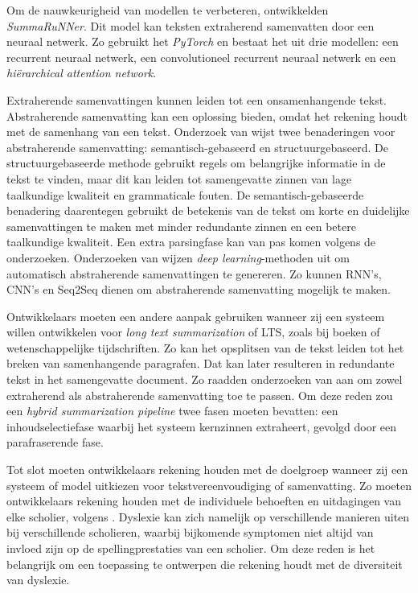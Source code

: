 Om de nauwkeurigheid van modellen te verbeteren, ontwikkelden \textcite{Nallapati2017} \textit{SummaRuNNer}. Dit model kan teksten extraherend samenvatten door een neuraal netwerk. Zo gebruikt het \textit{PyTorch} en bestaat het uit drie modellen: een recurrent neuraal netwerk, een convolutioneel recurrent neuraal netwerk en een \textit{hiërarchical attention network}.

\medspace

Extraherende samenvattingen kunnen leiden tot een onsamenhangende tekst. Abstraherende samenvatting kan een oplossing bieden, omdat het rekening houdt met de samenhang van een tekst. Onderzoek van \textcite{Gupta2019} wijst twee benaderingen voor abstraherende samenvatting: semantisch-gebaseerd en structuurgebaseerd. De structuurgebaseerde methode gebruikt regels om belangrijke informatie in de tekst te vinden, maar dit kan leiden tot samengevatte zinnen van lage taalkundige kwaliteit en grammaticale fouten. De semantisch-gebaseerde benadering daarentegen gebruikt de betekenis van de tekst om korte en duidelijke samenvattingen te maken met minder redundante zinnen en een betere taalkundige kwaliteit. Een extra parsingfase kan van pas komen volgens de onderzoeken. Onderzoeken van \textcite{Suleiman2020, Cao2022} wijzen \textit{deep learning}-methoden uit om automatisch abstraherende samenvattingen te genereren. Zo kunnen RNN's, CNN's en Seq2Seq dienen om abstraherende samenvatting mogelijk te maken. 

\medspace

Ontwikkelaars moeten een andere aanpak gebruiken wanneer zij een systeem willen ontwikkelen voor \textit{long text summarization} of LTS, zoals bij boeken of wetenschappelijke tijdschriften. Zo kan het opsplitsen van de tekst leiden tot het breken van samenhangende paragrafen. Dat kan later resulteren in redundante tekst in het samengevatte document. Zo raadden onderzoeken van \textcite{Hsu2018, Huang2019} aan om zowel extraherend als abstraherende samenvatting toe te passen. Om deze reden zou een \textit{hybrid summarization pipeline} twee fasen moeten bevatten: een inhoudselectiefase waarbij het systeem kernzinnen extraheert, gevolgd door een parafraserende fase.

\medspace

Tot slot moeten ontwikkelaars rekening houden met de doelgroep wanneer zij een systeem of model uitkiezen voor tekstvereenvoudiging of samenvatting. Zo moeten ontwikkelaars rekening houden met de individuele behoeften en uitdagingen van elke scholier, volgens \textcite{Gooding2022}. Dyslexie kan zich namelijk op verschillende manieren uiten bij verschillende scholieren, waarbij bijkomende symptomen niet altijd van invloed zijn op de spellingprestaties van een scholier. Om deze reden is het belangrijk om een toepassing te ontwerpen die rekening houdt met de diversiteit van dyslexie.

